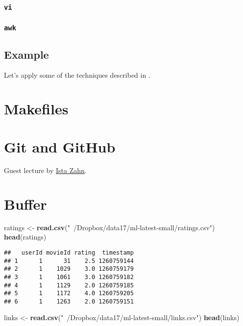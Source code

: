 \documentclass[]{book}
\newenvironment{Shaded}{\begin{snugshade}}{\end{snugshade}}
\newcommand{\KeywordTok}[1]{\textcolor[rgb]{0.13,0.29,0.53}{\textbf{{#1}}}}
\newcommand{\StringTok}[1]{\textcolor[rgb]{0.31,0.60,0.02}{{#1}}}
\newcommand{\NormalTok}[1]{{#1}}
\theoremstyle{definition}
\theoremstyle{definition}
\theoremstyle{definition}
\theoremstyle{remark}
\begin{document}
\subsubsection{\texorpdfstring{\texttt{vi}}{vi}}\label{vi}

\subsubsection{\texorpdfstring{\texttt{awk}}{awk}}\label{awk}

\subsection{Example}\label{example}

Let's apply some of the techniques described in \citet{Blackwell2012}.

\section{Makefiles}\label{makefiles}

\section{Git and GitHub}\label{git-and-github}

Guest lecture by \href{https://www.iq.harvard.edu/people/ista-zahn}{Ista
Zahn}.

\section{Buffer}\label{buffer}

\begin{Shaded}
\begin{Highlighting}[]
\NormalTok{ratings <-}\StringTok{ }\KeywordTok{read.csv}\NormalTok{(}\StringTok{"~/Dropbox/data17/ml-latest-small/ratings.csv"}\NormalTok{)}
\KeywordTok{head}\NormalTok{(ratings)}
\end{Highlighting}
\end{Shaded}

\begin{verbatim}
##   userId movieId rating  timestamp
## 1      1      31    2.5 1260759144
## 2      1    1029    3.0 1260759179
## 3      1    1061    3.0 1260759182
## 4      1    1129    2.0 1260759185
## 5      1    1172    4.0 1260759205
## 6      1    1263    2.0 1260759151
\end{verbatim}

\begin{Shaded}
\begin{Highlighting}[]
\NormalTok{links <-}\StringTok{ }\KeywordTok{read.csv}\NormalTok{(}\StringTok{"~/Dropbox/data17/ml-latest-small/links.csv"}\NormalTok{)}
\KeywordTok{head}\NormalTok{(links)}
\end{Highlighting}
\end{Shaded}
\end{document}
